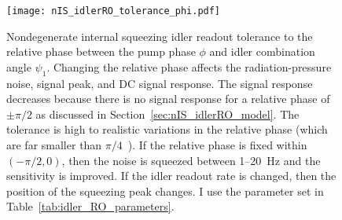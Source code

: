 \begin{figure}
    \centering
    \texttt{[image: nIS\_idlerRO\_tolerance\_phi.pdf]}
    \caption{ Nondegenerate internal squeezing idler readout tolerance to the relative phase between the pump phase $\phi$ and idler combination angle $\psi_1$. Changing the relative phase affects the radiation-pressure noise, signal peak, and DC signal response. The signal response decreases because there is no signal response for a relative phase of $\pm\pi/2$ as discussed in Section~\ref{sec:nIS_idlerRO_model}. The tolerance is high to realistic variations in the relative phase (which are far smaller than $\pi/4$~\cite{Yap:19}). If the relative phase is fixed within $(-\pi/2,0)$, then the noise is squeezed between 1--20~Hz and the sensitivity is improved. If the idler readout rate is changed, then the position of the squeezing peak changes. I use the parameter set in Table~\ref{tab:idler_RO_parameters}.}
    \label{fig:nIS_idlerRO_tolerance_phi}
\end{figure}

